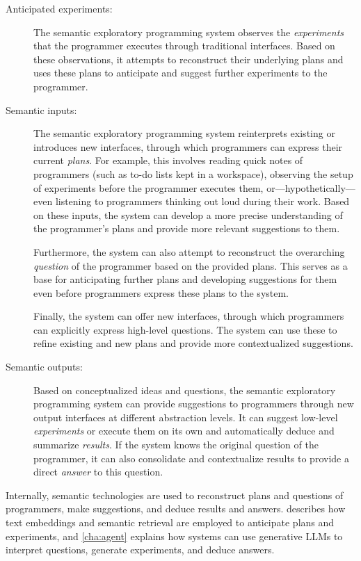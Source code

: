 \begin{description}
	\item[Anticipated experiments:]
	The semantic exploratory programming system observes the \emph{experiments} that the programmer executes through traditional interfaces.
	Based on these observations, it attempts to reconstruct their underlying plans and uses these plans to anticipate and suggest further experiments to the programmer.

	\item[Semantic inputs:]
	The semantic exploratory programming system reinterprets existing or introduces new interfaces, through which programmers can express their current \emph{plans}.
	For example, this involves reading quick notes of programmers (such as to-do lists kept in a workspace), observing the setup of experiments before the programmer executes them, or---hypothetically---even listening to programmers thinking out loud during their work.
	Based on these inputs, the system can develop a more precise understanding of the programmer's plans and provide more relevant suggestions to them.

	Furthermore, the system can also attempt to reconstruct the overarching \emph{question} of the programmer based on the provided plans.
	This serves as a base for anticipating further plans and developing suggestions for them even before programmers express these plans to the system.

	Finally, the system can offer new interfaces, through which programmers can explicitly express high-level questions.
	The system can use these to refine existing and new plans and provide more contextualized suggestions.

	\item[Semantic outputs:]
	Based on conceptualized ideas and questions, the semantic exploratory programming system can provide suggestions to programmers through new output interfaces at different abstraction levels.
	It can suggest low-level \emph{experiments} or execute them on its own and automatically deduce and summarize \emph{results}.
	If the system knows the original question of the programmer, it can also consolidate and contextualize results to provide a direct \emph{answer} to this question.
\end{description}

Internally, semantic technologies are used to reconstruct plans and questions of programmers, make suggestions, and deduce results and answers.
 describes how text embeddings and semantic retrieval are employed to anticipate plans and experiments, and \cref{cha:agent} explains how systems can use generative LLMs to interpret questions, generate experiments, and deduce answers.

